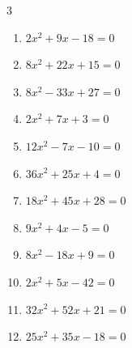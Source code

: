 \begin{multicols}{3}
\begin{enumerate}
  \item $2x^{2}+9x-18=0$


  \item $8x^{2}+22x+15=0$


\columnbreak %

\resetques

  \item $8x^{2}-33x+27=0$


  \item $2x^{2}+7x+3=0$


  \item $12x^{2}-7x-10=0$


  \item $36x^{2}+25x+4=0$


  \item $18x^{2}+45x+28=0$


  \item $9x^{2}+4x-5=0$


  \item $8x^{2}-18x+9=0$


  \item $2x^{2}+5x-42=0$


  \item $32x^{2}+52x+21=0$


  \item $25x^{2}+35x-18=0$



\end{enumerate}
\end{multicols}
